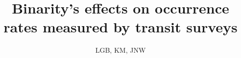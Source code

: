 \documentclass[12pt,modern]{aastex61}
\begin{document}
    
\title{ Binarity's effects on occurrence rates measured by transit surveys}

\author{
LGB, KM, JNW
}




\end{document}
